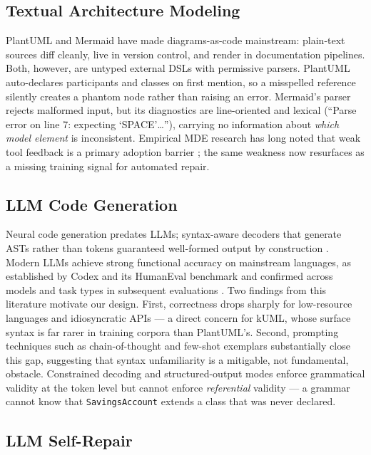 \documentclass[acmsmall,nonacm]{acmart}
\begin{document}
\subsection{Textual Architecture Modeling}

PlantUML and Mermaid have made diagrams-as-code mainstream: plain-text sources diff cleanly, live in version control, and render in documentation pipelines. Both, however, are untyped external DSLs with permissive parsers. PlantUML auto-declares participants and classes on first mention, so a misspelled reference silently creates a phantom node rather than raising an error. Mermaid's parser rejects malformed input, but its diagnostics are line-oriented and lexical (``Parse error on line 7: expecting `SPACE'\ldots''), carrying no information about \emph{which model element} is inconsistent. Empirical MDE research has long noted that weak tool feedback is a primary adoption barrier \citep{whittle2013}; the same weakness now resurfaces as a missing training signal for automated repair.

\subsection{LLM Code Generation}

Neural code generation predates LLMs; syntax-aware decoders that generate ASTs rather than tokens guaranteed well-formed output by construction \citep{yinneubig2017}. Modern LLMs \citep{brown2020,openai2023} achieve strong functional accuracy on mainstream languages, as established by Codex and its HumanEval benchmark \citep{chen2021} and confirmed across models and task types in subsequent evaluations \citep{peng2023,leinonen2023}. Two findings from this literature motivate our design. First, correctness drops sharply for low-resource languages and idiosyncratic APIs --- a direct concern for kUML, whose surface syntax is far rarer in training corpora than PlantUML's. Second, prompting techniques such as chain-of-thought \citep{wei2022} and few-shot exemplars substantially close this gap, suggesting that syntax unfamiliarity is a mitigable, not fundamental, obstacle. Constrained decoding and structured-output modes enforce grammatical validity at the token level but cannot enforce \emph{referential} validity --- a grammar cannot know that \texttt{SavingsAccount} extends a class that was never declared.

\subsection{LLM Self-Repair}
\end{document}
